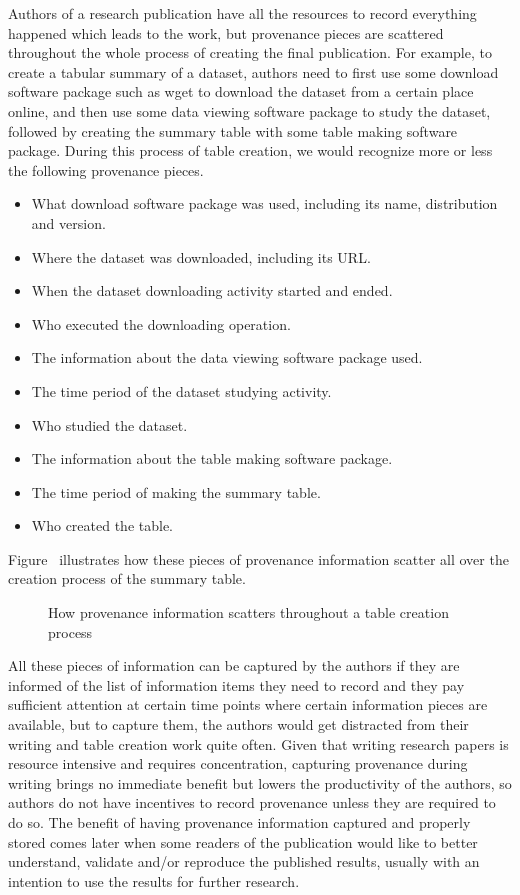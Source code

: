 Authors of a research publication have all the resources to record everything happened which leads to the work, but provenance pieces are scattered throughout the whole process of creating the final publication. For example, to create a tabular summary of a dataset, authors need to first use some download software package such as wget to download the dataset from a certain place online, and then use some data viewing software package to study the dataset, followed by creating the summary table with some table making software package. During this process of table creation, we would recognize more or less the following provenance pieces.
\begin{itemize}
\item What download software package was used, including its name, distribution and version.
\item Where the dataset was downloaded, including its URL.
\item When the dataset downloading activity started and ended.
\item Who executed the downloading operation.
\item The information about the data viewing software package used.
\item The time period of the dataset studying activity.
\item Who studied the dataset.
\item The information about the table making software package.
\item The time period of making the summary table.
\item Who created the table.
\end{itemize}
Figure~\cite{prov-pieces} illustrates how these pieces of provenance information scatter all over the creation process of the summary table.
\begin{figure}
\centering
\caption{How provenance information scatters throughout a table creation process}
\end{figure}
All these pieces of information can be captured by the authors if they are informed of the list of information items they need to record and they pay sufficient attention at certain time points where certain information pieces are available, but to capture them, the authors would get distracted from their writing and table creation work quite often. Given that writing research papers is resource intensive and requires concentration, capturing provenance during writing brings no immediate benefit but lowers the productivity of the authors, so authors do not have incentives to record provenance unless they are required to do so. The benefit of having provenance information captured and properly stored comes later when some readers of the publication would like to better understand, validate and/or reproduce the published results, usually with an intention to use the results for further research.

